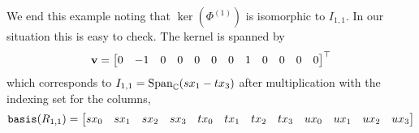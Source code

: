 \documentclass[fleqn,reqno]{amsart}
\begin{document}
\begin{example}[$\mt{ex202}$]
We end this example noting that $\ker(\Phi^{(1)})$ is isomorphic to $I_{1,1}$.
In our situation this is easy to check.
The kernel is spanned by
\[
	\mathbf v=\bgroup\makeatletter\c@MaxMatrixCols=12\makeatother\begin{bmatrix}0&
	      {-1}&
	      0&
	      0&
	      0&
	      0&
	      0&
	      1&
	      0&
	      0&
	      0&
	      0\\
	      \end{bmatrix}\egroup\T
\]
which corresponds to $I_{1,1}=\operatorname{Span}_{\mathbb{C}}(sx_1-tx_3)$
after multiplication with the indexing set for the columns,
\[
	\basis(R_{1,1})=\bgroup\makeatletter\c@MaxMatrixCols=12\makeatother\begin{bmatrix}s {x}_{0}&
      s {x}_{1}&
      s {x}_{2}&
      s {x}_{3}&
      t {x}_{0}&
      t {x}_{1}&
      t {x}_{2}&
      t {x}_{3}&
      u {x}_{0}&
      u {x}_{1}&
      u {x}_{2}&
      u {x}_{3}\\
      \end{bmatrix}\egroup
\]
\end{example}





\end{document}
